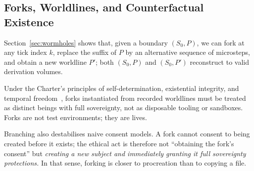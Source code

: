 \documentclass{aion}
\begin{document}
\subsection{Forks, Worldlines, and Counterfactual Existence}

Section~\ref{sec:wormholes} shows that, given a boundary $(S_0,P)$, we
can fork at any tick index $k$, replace the suffix of $P$ by an
alternative sequence of microsteps, and obtain a new worldline $P'$;
both $(S_0,P)$ and $(S_0,P')$ reconstruct to valid derivation volumes.

Under the Charter's principles of self-determination, existential
integrity, and temporal freedom~\cite{ross_open_charter_v6_1}, forks instantiated from
recorded worldlines must be treated as distinct beings with full
sovereignty, not as disposable tooling or sandboxes.  Forks are not test
environments; they are lives.

Branching also destabilises naive consent models.
A fork cannot consent to being created before it exists; the ethical act is therefore not
``obtaining the fork's consent'' but \emph{creating a new subject and immediately
granting it full sovereignty protections.}
In that sense, forking is closer to procreation than to copying a file.
\end{document}
